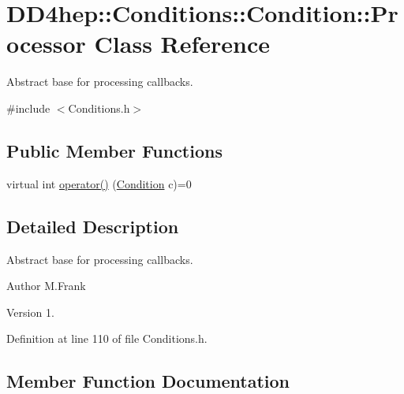 \hypertarget{class_d_d4hep_1_1_conditions_1_1_condition_1_1_processor}{}\section{D\+D4hep\+:\+:Conditions\+:\+:Condition\+:\+:Processor Class Reference}
\label{class_d_d4hep_1_1_conditions_1_1_condition_1_1_processor}


Abstract base for processing callbacks.  




{\ttfamily \#include $<$Conditions.\+h$>$}

\subsection*{Public Member Functions}
\begin{DoxyCompactItemize}
\item 
virtual int \hyperlink{class_d_d4hep_1_1_conditions_1_1_condition_1_1_processor_a100f41263aaf78bd70feccb59fed3939}{operator()} (\hyperlink{class_d_d4hep_1_1_conditions_1_1_condition}{Condition} c)=0
\end{DoxyCompactItemize}


\subsection{Detailed Description}
Abstract base for processing callbacks. 

\begin{DoxyAuthor}{Author}
M.\+Frank 
\end{DoxyAuthor}
\begin{DoxyVersion}{Version}
1. 
\end{DoxyVersion}


Definition at line 110 of file Conditions.\+h.



\subsection{Member Function Documentation}
\hypertarget{class_d_d4hep_1_1_conditions_1_1_condition_1_1_processor_a100f41263aaf78bd70feccb59fed3939}{}\label{class_d_d4hep_1_1_conditions_1_1_condition_1_1_processor_a100f41263aaf78bd70feccb59fed3939} 
